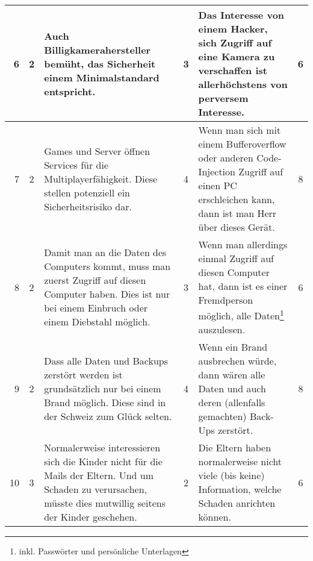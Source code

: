 \begin{landscape}
\begin{tabularx}{\columnwidth}{|r|c|X|c|X|c|}
	6 &  \cellcolor{yellow}2 & Auch Billigkamerahersteller bemüht, das Sicherheit einem Minimalstandard entspricht. & \cellcolor{orange}3 & Das Interesse von einem Hacker, sich Zugriff auf eine Kamera zu verschaffen ist allerhöchstens von perversem Interesse. & \cellcolor{yellow}6 \\ \hline\textsl{}
	
	7 &  \cellcolor{yellow}2 & Games und Server öffnen Services für die Multiplayerfähigkeit. Diese stellen potenziell ein Sicherheitsrisiko dar. & \cellcolor{red}4 & Wenn man sich mit einem Bufferoverflow oder anderen Code-Injection Zugriff auf einen PC erschleichen kann, dann ist man Herr über dieses Gerät. & \cellcolor{orange}8 \\ \hline
	
	8 &  \cellcolor{yellow}2 & Damit man an die Daten des Computers kommt, muss man zuerst Zugriff auf diesen Computer haben. Dies ist nur bei einem Einbruch oder einem Diebstahl möglich. & \cellcolor{orange}3 & Wenn man allerdings einmal Zugriff auf diesen Computer hat, dann ist es einer Fremdperson möglich, alle Daten\footnote{inkl. Passwörter und persönliche Unterlagen} auszulesen.  & \cellcolor{yellow}6 \\ \hline
	
	9 &  \cellcolor{yellow}2 & Dass alle Daten und Backups zerstört werden ist grundsätzlich nur bei einem Brand möglich. Diese sind in der Schweiz zum Glück selten. & \cellcolor{red}4 & Wenn ein Brand ausbrechen würde, dann wären alle Daten und auch deren (allenfalls gemachten) Back-Ups zerstört. & \cellcolor{orange}8 \\ \hline
	
	10 &  \cellcolor{orange}3 & Normalerweise interessieren sich die Kinder nicht für die Mails der Eltern. Und um Schaden zu verursachen, müsste dies mutwillig seitens der Kinder geschehen. & \cellcolor{yellow}2 & Die Eltern haben normalerweise nicht viele (bis keine) Information, welche Schaden anrichten können. & \cellcolor{yellow}6 \\ \hline
\end{tabularx}

\newpage

\end{landscape}